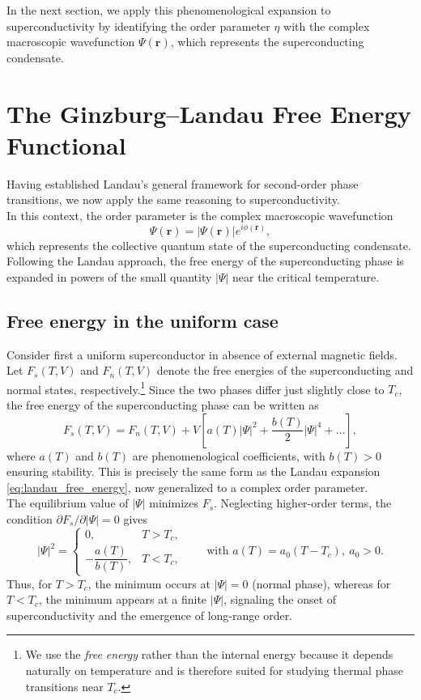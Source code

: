 In the next section, we apply this phenomenological expansion to superconductivity by identifying the order parameter \(\eta\) with the complex macroscopic wavefunction \(\Psi(\mathbf{r})\), which represents the superconducting condensate.


\section{The Ginzburg--Landau Free Energy Functional}
\label{sec:GL-functional}

Having established Landau’s general framework for second-order phase transitions, 
we now apply the same reasoning to superconductivity.\\
In this context, the order parameter is the complex macroscopic wavefunction
\[
\Psi(\mathbf{r}) = |\Psi(\mathbf{r})| e^{i\phi(\mathbf{r})},
\]
which represents the collective quantum state of the superconducting condensate.\\
Following the Landau approach, the free energy of the superconducting phase is expanded in powers of the small quantity $|\Psi|$ near the critical temperature.

\subsection*{Free energy in the uniform case} 
Consider first a uniform superconductor in absence of external magnetic fields.  
Let $F_s(T,V)$ and $F_n(T,V)$ denote the free energies of the superconducting and normal states, respectively.\footnote{%
We use the \emph{free energy} rather than the internal energy because it depends naturally on temperature and is therefore suited for studying thermal phase transitions near $T_c$.}
Since the two phases differ just slightly close to $T_c$, the free energy of the superconducting phase can be written as
\begin{equation}
F_s(T,V) = F_n(T,V) + V\!\left[a(T)|\Psi|^2 + \frac{b(T)}{2}|\Psi|^4 + \dots\right],
\label{eq:GL_free_energy_uniform}
\end{equation}
where $a(T)$ and $b(T)$ are phenomenological coefficients, with $b(T) > 0$ ensuring stability. This is precisely the same form as the Landau expansion \eqref{eq:landau_free_energy}, now generalized to a complex order parameter.\\
The equilibrium value of $|\Psi|$ minimizes $F_s$.  
Neglecting higher-order terms, the condition $\partial F_s / \partial |\Psi| = 0$ gives
\[
|\Psi|^2 = 
\begin{cases}
0, & T > T_c,\\[4pt]
-\dfrac{a(T)}{b(T)}, & T < T_c,
\end{cases}
\qquad \text{with } a(T) = a_0(T - T_c), \ a_0 > 0.
\]
Thus, for $T > T_c$, the minimum occurs at $|\Psi| = 0$ (normal phase), 
whereas for $T < T_c$, the minimum appears at a finite $|\Psi|$, signaling the onset of superconductivity and the emergence of long-range order.


